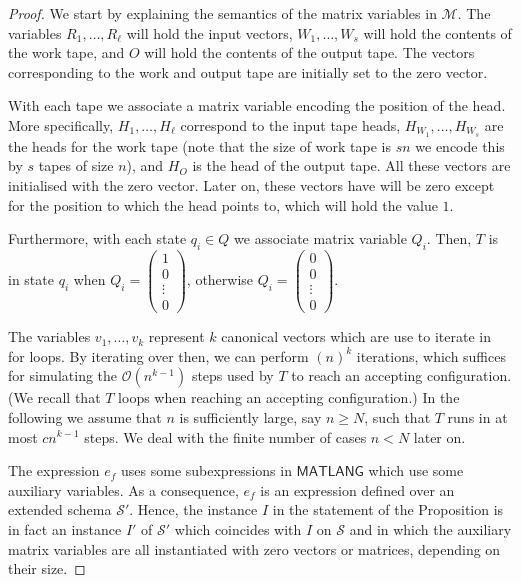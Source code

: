 \begin{proof}
We start by explaining the semantics of the matrix variables in $\mathcal{M}$. The variables $R_1,\ldots,R_\ell$ will hold the input vectors, $W_1,\ldots,W_s$ will hold the contents of the work
tape, and $O$ will hold the contents of the output tape. The vectors corresponding to the work and output tape are initially set to the zero vector.

 With each tape we associate a matrix variable encoding the position of the head. More specifically, $H_1,\ldots,H_\ell$ correspond to the input tape heads,
$H_{W_1},\ldots, H_{W_s}$ are the heads for the work tape (note that the size of work tape is $sn$ we encode this by $s$ tapes of size $n$), and $H_O$ is the head of the output tape. All these vectors are initialised with the zero vector. Later on, these vectors have will be zero except for the position to which the head points to, which will hold the value $1$.

%
Furthermore, with each state $q_i\in Q$ we associate matrix variable $Q_i$.
Then, $T$ is in state $q_i$ when
 $Q_i=\left(\begin{smallmatrix}1\\
0\\\vdots\\0\end{smallmatrix}\right)$, otherwise $Q_i=\left(\begin{smallmatrix}0\\
0\\\vdots\\0\end{smallmatrix}\right)$.	

The variables $v_1,\ldots,v_{k}$ represent $k$ canonical vectors  which are use to iterate in for loops. By iterating over then, we can perform $(n)^{k}$ iterations, which suffices for simulating the $\mathcal{O}(n^{k-1})$ steps used by $T$ to reach an accepting configuration. (We recall that $T$ loops when reaching an accepting configuration.) In the following
we assume that $n$ is sufficiently large, say $n\geq N$, such that $T$ runs in at most $cn^{k-1}$ steps. We deal with
the finite number of cases $n<N$ later on.

The expression $e_f$ uses some subexpressions in $\mathsf{MATLANG}$ which use some auxiliary variables.
As a consequence, $e_f$ is an expression defined over an extended schema $\mathcal{S}'$. Hence, the instance $I$ in the statement of the Proposition is in fact an instance $I'$ of $\mathcal{S}'$ which
coincides with $I$ on $\mathcal{S}$ and in which the auxiliary matrix variables are all instantiated with zero vectors or matrices, depending on their size.


\end{proof}
